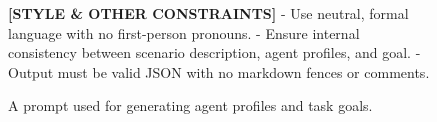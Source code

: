 \begin{figure}[t!]
\begin{tcolorbox}[
colframe=black,        
colback=gray!10,
arc=2mm,
boxrule=1.5pt,   
title=\textbf{Prompts},
fonttitle=\bfseries
]
\textbf{[STYLE \& OTHER CONSTRAINTS]}
- Use neutral, formal language with no first-person pronouns.
- Ensure internal consistency between scenario description, agent profiles, and goal.
- Output must be valid JSON with no markdown fences or comments.

\end{tcolorbox}
\caption{A prompt used for generating agent profiles and task goals.}
\label{fig:prompt_dataset_1}
\end{figure}
